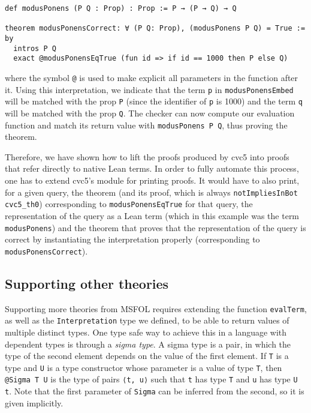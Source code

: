 \begin{verbatim}
def modusPonens (P Q : Prop) : Prop := P → (P → Q) → Q

theorem modusPonensCorrect: ∀ (P Q: Prop), (modusPonens P Q) = True := by
  intros P Q
  exact @modusPonensEqTrue (fun id => if id == 1000 then P else Q)
\end{verbatim}
where the symbol \texttt{@} is used to make explicit all parameters
in the function after it. Using this interpretation, we indicate
that the term \texttt{p} in \texttt{modusPonensEmbed}
will be matched with the prop \texttt{P} (since the identifier of \texttt{p}
is 1000) and the term \texttt{q} will be matched with the prop \texttt{Q}.
The checker can now compute our evaluation function and
match its return value with \texttt{modusPonens P Q}, thus proving the theorem.

Therefore, we have shown how to lift the proofs produced by cvc5 into proofs
that refer directly to native Lean terms. In order to fully automate this
process, one has to extend cvc5's module for printing proofs. It would
have to also print, for a given query, the theorem (and its proof, which is always
\texttt{notImpliesInBot cvc5\_th0}) corresponding to \texttt{modusPonensEqTrue} for that query,
the representation of the query as a Lean term (which in this example was the term \texttt{modusPonens})
and the theorem that proves that the representation of the query is correct by instantiating the interpretation
properly (corresponding to \texttt{modusPonensCorrect}).

\subsection{Supporting other theories}

Supporting more theories from MSFOL requires extending the function \texttt{evalTerm},
as well as the \texttt{Interpretation} type we defined, to be able to return values
of multiple distinct types. One type safe way to achieve this in a language with
dependent types is through a \textit{sigma type}. A sigma type is a pair, in which
the type of the second element depends on the value of the first element. If
\texttt{T} is a type and \texttt{U} is a type constructor whose parameter
is a value of type \texttt{T},
then \texttt{@Sigma T U} is the type
of pairs \texttt{⟨t, u⟩} such that \texttt{t} has type \texttt{T} and
\texttt{u} has type \texttt{U t}. Note that the first parameter of \texttt{Sigma}
can be inferred from the second, so it is given implicitly.

